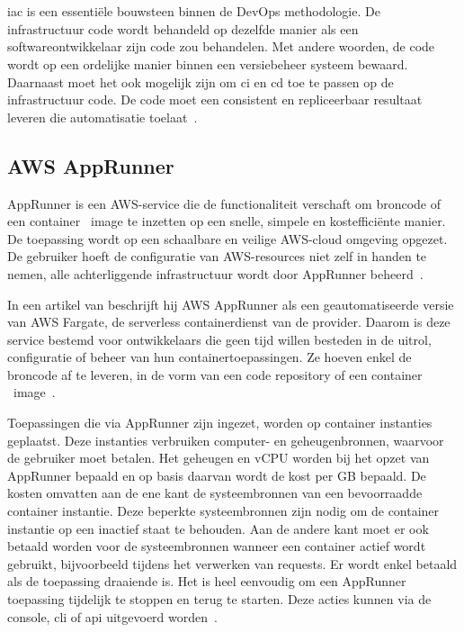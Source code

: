 \chapter{}
\label{ch:stand-van-zaken}

\acrfull{iac} is een essentiële bouwsteen binnen de DevOps methodologie.
De infrastructuur code wordt behandeld op dezelfde manier als een softwareontwikkelaar zijn code zou behandelen.
Met andere woorden, de code wordt op een ordelijke manier binnen een versiebeheer systeem bewaard.
Daarnaast moet het ook mogelijk zijn om \acrfull{ci} en \acrfull{cd} toe te passen op de infrastructuur code.
De code moet een consistent en repliceerbaar resultaat leveren die automatisatie toelaat~\autocite{Mansoor2014}.

\section{AWS AppRunner}
\label{sec:service-apprunner}

AppRunner is een AWS-service die de functionaliteit verschaft om broncode of een container ~\gls{image} te inzetten op een snelle, simpele en kostefficiënte manier.
De toepassing wordt op een schaalbare en veilige AWS-cloud omgeving opgezet.
De gebruiker hoeft de configuratie van AWS-resources niet zelf in handen te nemen, alle achterliggende infrastructuur wordt door AppRunner beheerd~\autocite{Khen2022}.

In een artikel van \textcite{Aussems2021} beschrijft hij AWS AppRunner als een geautomatiseerde versie van AWS Fargate, de serverless containerdienst van de provider.
Daarom is deze service bestemd voor ontwikkelaars die geen tijd willen besteden in de uitrol, configuratie of beheer van hun containertoepassingen.
Ze hoeven enkel de broncode af te leveren, in de vorm van een code repository of een container ~\gls{image}~\autocite{Khen2022}.

Toepassingen die via AppRunner zijn ingezet, worden op container instanties geplaatst.
Deze instanties verbruiken computer- en geheugenbronnen, waarvoor de gebruiker moet betalen.
Het geheugen en vCPU worden bij het opzet van AppRunner bepaald en op basis daarvan wordt de kost per GB bepaald.
De kosten omvatten aan de ene kant de systeembronnen van een bevoorraadde container instantie.
Deze beperkte systeembronnen zijn nodig om de container instantie op een inactief staat te behouden.
Aan de andere kant moet er ook betaald worden voor de systeembronnen wanneer een container actief wordt gebruikt, bijvoorbeeld tijdens het verwerken van requests.
Er wordt enkel betaald als de toepassing draaiende is.
Het is heel eenvoudig om een AppRunner toepassing tijdelijk te stoppen en terug te starten.
Deze acties kunnen via de console, \acrshort{cli} of \acrshort{api} uitgevoerd worden~\autocite{AWSAppRunnerPricing}.

